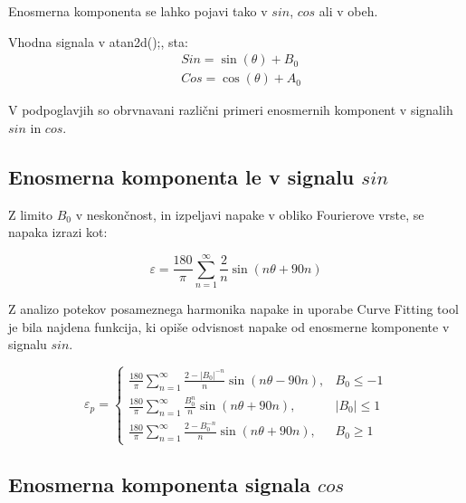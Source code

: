 Enosmerna komponenta se lahko pojavi tako v $sin$, $cos$ ali v obeh.

Vhodna signala v atan2d();, sta:
\begin{eqnarray}
\label{equ:def_sin_ama}
&Sin = \sin(\theta) + B_0\\
\label{equ:def_cos_amp}
&Cos =\cos(\theta) +A_0
\end{eqnarray}

V podpoglavjih so obrvnavani različni primeri enosmernih komponent v signalih $sin$ in $cos$.
\subsection{Enosmerna komponenta le v signalu $sin$}

Z limito $B_0$ v neskončnost, in izpeljavi napake v obliko Fourierove vrste, se napaka izrazi kot:


\begin{equation}
\varepsilon = \frac{180}{\pi}\sum_{n=1}^{\infty}\frac{2}{n} \sin (n \theta + 90 n)
\end{equation}


Z analizo potekov posameznega harmonika napake in uporabe Curve Fitting tool je bila najdena funkcija, ki opiše odvisnost napake od enosmerne komponente v signalu $sin$.

\begin{equation}
\label{vrsta_sinoff}
\varepsilon_p=
\begin{cases}
\frac{180}{\pi}\sum_{n=1}^{\infty}\frac{2-|B_0|^{-n}}{n} \sin (n \theta -  90 n), & B_0\leq -1 \\
\frac{180}{\pi}\sum_{n=1}^{\infty}\frac{B_0^n}{n} \sin (n \theta + 90 n), & |B_0|\leq 1 \\
\frac{180}{\pi}\sum_{n=1}^{\infty}\frac{2-B_0^{-n}}{n} \sin (n \theta + 90 n), & B_0\geq 1
\end{cases}
\end{equation}





\subsection{Enosmerna komponenta signala $cos$}

